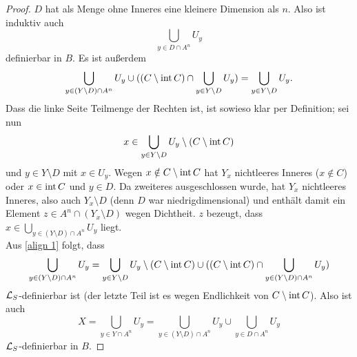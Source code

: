 \begin{proof}
	$D$ hat als Menge ohne Inneres eine kleinere Dimension als $n$. Also ist induktiv auch $$\bigcup\limits_{y\in D\cap A^n}U_y$$ definierbar in $B$. Es ist außerdem
	\begin{align}\label{align 1}
	\bigcup\limits_{y\in (Y\setminus D)\cap A^n}U_y\cup((C\setminus\operatorname{int} C)\cap\bigcup\limits_{y\in Y\setminus D}U_y)=\bigcup\limits_{y\in Y\setminus D}U_y.
	\end{align}
	Dass die linke Seite Teilmenge der Rechten ist, ist sowieso klar per Definition; sei nun $$x\in\bigcup\limits_{y\in Y\setminus D}U_y\setminus (C\setminus\operatorname{int} C)$$ und $y\in Y\setminus D$ mit $x\in U_y$. Wegen $x\notin C\setminus\operatorname{int} C$ hat $Y_x$ nichtleeres Inneres ($x\notin C$) oder $x\in\operatorname{int} C$ und $y\in D$. Da zweiteres ausgeschlossen wurde, hat $Y_x$ nichtleeres Inneres, also auch $Y_x\setminus D$ (denn $D$ war niedrigdimensional) und enthält damit ein Element $z\in A^n\cap(Y_x\setminus D)$ wegen Dichtheit. $z$ bezeugt, dass $x\in\bigcup\limits_{y\in (Y\setminus D)\cap A^n}U_y$ liegt.\\
	Aus \ref{align 1} folgt, dass $$\bigcup\limits_{y\in (Y\setminus D)\cap A^n}U_y=\bigcup\limits_{y\in Y\setminus D}U_y\setminus(C\setminus\operatorname{int} C)\cup((C\setminus\operatorname{int} C)\cap\bigcup\limits_{y\in (Y\setminus D)\cap A^n}U_y)$$ $\mathcal{L}_S$-definierbar ist (der letzte Teil ist es wegen Endlichkeit von $C\setminus\operatorname{int} C$). Also ist auch $$X=\bigcup\limits_{y\in Y\cap A^n}U_y=\bigcup\limits_{y\in (Y\setminus D)\cap A^n}U_y\cup\bigcup\limits_{y\in D\cap A^n}U_y$$ $\mathcal{L}_S$-definierbar in $B$.
\end{proof}

